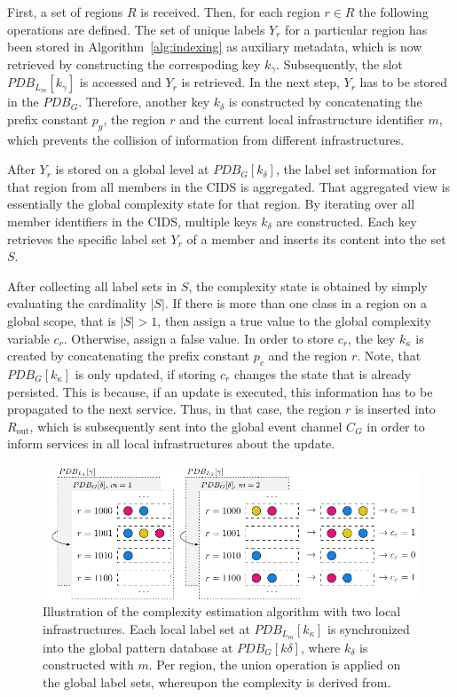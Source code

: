 First, a set of regions $R$ is received. Then, for each region $r \in R$ the following operations are defined. The set of unique labels $Y_r$ for a particular region has been stored in Algorithm~\ref{alg:indexing} as auxiliary metadata, which is now retrieved by constructing the correspoding key $k_\gamma$. Subsequently, the slot $PDB_{L_m}[k_\gamma]$ is accessed and $Y_r$ is retrieved. In the next step, $Y_r$ has to be stored in the $PDB_G$. Therefore, another key $k_\delta$ is constructed by concatenating the prefix constant $p_y$, the region $r$ and the current local infrastructure identifier $m$, which prevents the collision of information from different infrastructures.

After $Y_r$ is stored on a global level at $PDB_G[k_\delta]$, the label set information for that region from all members in the CIDS is aggregated. That aggregated view is essentially the global complexity state for that region. By iterating over all member identifiers in the CIDS, multiple keys $k_\delta$ are constructed. Each key retrieves the specific label set $Y_r$ of a member and inserts its content into the set $S$. 

After collecting all label sets in $S$, the complexity state is obtained by simply evaluating the cardinality $|S|$. If there is more than one class in a region on a global scope, that is $|S| > 1$, then assign a true value to the global complexity variable $c_r$. Otherwise, assign a false value. In order to store $c_r$, the key $k_\kappa$ is created by concatenating the prefix constant $p_c$ and the region $r$. Note, that $PDB_G[k_\kappa]$ is only updated, if storing $c_r$ changes the state that is already persisted. This is because, if an update is executed, this information has to be propagated to the next service. Thus, in that case, the region $r$ is inserted into $R_{\text{out}}$, which is subsequently sent into the global event channel $C_G$ in order to inform services in all local infrastructures about the update.

\begin{figure}[t]
   \centering
   \includegraphics[width=1\linewidth]{tikz/complexity_estimation.pdf}
   \caption{Illustration of the complexity estimation algorithm with two local infrastructures. Each local label set at $PDB_{L_m}[k_\kappa]$ is synchronized into the global pattern database at $PDB_G[k\delta]$, where $k_\delta$ is constructed with $m$. Per region, the union operation is applied on the global label sets, whereupon the complexity is derived from.}  \label{fig:complexity_estimation}
\end{figure}